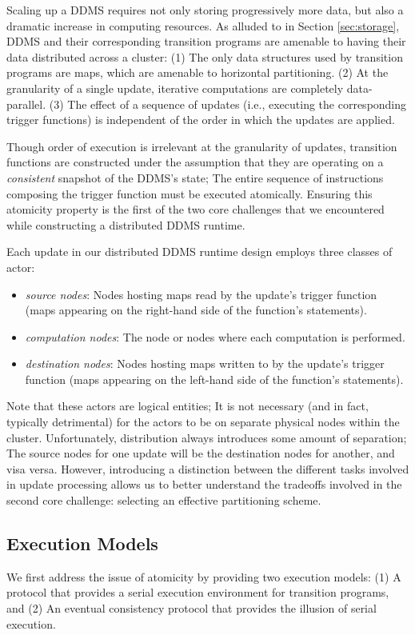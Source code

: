 Scaling up a DDMS requires not only storing progressively more data, but also a dramatic increase in computing resources.  As alluded to in Section \ref{sec:storage}, DDMS and their corresponding transition programs are amenable to having their data distributed across a cluster: (1) The only data structures used by transition programs are maps, which are amenable to horizontal partitioning.  (2) At the granularity of a single update, iterative computations are completely data-parallel.  (3) The effect of a sequence of updates (i.e., executing the corresponding trigger functions) is independent of the order in which the updates are applied.

Though order of execution is irrelevant at the granularity of updates, transition functions are constructed under the assumption that they are operating on a \textit{consistent} snapshot of the DDMS's state; The entire sequence of instructions composing the trigger function must be executed atomically.  Ensuring this atomicity property is the first of the two core challenges that we encountered while constructing a distributed DDMS runtime.

Each update in our distributed DDMS runtime design employs three classes of actor:
\begin{itemize}
\item \textit{source nodes}: Nodes hosting maps read by the update's trigger function (maps appearing on the right-hand side of the function's statements).
\item \textit{computation nodes}: The node or nodes where each computation is performed.
\item \textit{destination nodes}: Nodes hosting maps written to by the update's trigger function (maps appearing on the left-hand side of the function's statements).
\end{itemize}
Note that these actors are logical entities; It is not necessary (and in fact, typically detrimental) for the actors to be on separate physical nodes within the cluster.  Unfortunately, distribution always introduces some amount of separation; The source nodes for one update will be the destination nodes for another, and visa versa.  However, introducing a distinction between the different tasks involved in update processing allows us to better understand the tradeoffs involved in the second core challenge: selecting an effective partitioning scheme.  

\subsection{Execution Models}
We first address the issue of atomicity by providing two execution models: (1) A protocol that provides a serial execution environment for transition programs, and (2) An eventual consistency protocol that provides the illusion of serial execution.

